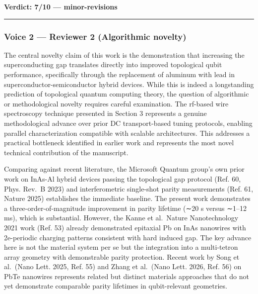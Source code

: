 \documentclass[10pt,letterpaper]{article}
\begin{document}
\textbf{Verdict: 7/10 --- minor-revisions}

\begin{center}\rule{0.5\linewidth}{0.5pt}\end{center}

\hypertarget{voice-2-reviewer-2-algorithmic-novelty}{%
\subsubsection{Voice 2 --- Reviewer 2 (Algorithmic novelty)}\label{voice-2-reviewer-2-algorithmic-novelty}}

The central novelty claim of this work is the demonstration that increasing the superconducting gap translates directly into improved topological qubit performance, specifically through the replacement of aluminum with lead in superconductor-semiconductor hybrid devices. While this is indeed a longstanding prediction of topological quantum computing theory, the question of algorithmic or methodological novelty requires careful examination. The rf-based wire spectroscopy technique presented in Section 3 represents a genuine methodological advance over prior DC transport-based tuning protocols, enabling parallel characterization compatible with scalable architectures. This addresses a practical bottleneck identified in earlier work and represents the most novel technical contribution of the manuscript.

Comparing against recent literature, the Microsoft Quantum group's own prior work on InAs-Al hybrid devices passing the topological gap protocol (Ref. 60, Phys. Rev.~B 2023) and interferometric single-shot parity measurements (Ref. 61, Nature 2025) establishes the immediate baseline. The present work demonstrates a three-order-of-magnitude improvement in parity lifetime (∼20 s versus ∼1--12 ms), which is substantial. However, the Kanne et al.~Nature Nanotechnology 2021 work (Ref. 53) already demonstrated epitaxial Pb on InAs nanowires with 2e-periodic charging patterns consistent with hard induced gap. The key advance here is not the material system per se but the integration into a multi-tetron array geometry with demonstrable parity protection. Recent work by Song et al.~(Nano Lett. 2025, Ref. 55) and Zhang et al.~(Nano Lett. 2026, Ref. 56) on PbTe nanowires represents related but distinct materials approaches that do not yet demonstrate comparable parity lifetimes in qubit-relevant geometries.
\end{document}
